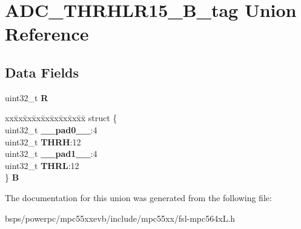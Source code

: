 \hypertarget{unionADC__THRHLR15__32B__tag}{}\section{A\+D\+C\+\_\+\+T\+H\+R\+H\+L\+R15\+\_\+B\+\_\+tag Union Reference}
\label{unionADC__THRHLR15__32B__tag}
\subsection*{Data Fields}
\begin{DoxyCompactItemize}
\item 
\mbox{\label{unionADC__THRHLR15__32B__tag_a14c2fc144d70d4cf0f5cd15288349dbd}} 
uint32\+\_\+t {\bfseries R}
\item 
\mbox{\label{unionADC__THRHLR15__32B__tag_a8a667bffa52e28fecea479ea8b7c681c}} 
\begin{tabbing}
xx\=xx\=xx\=xx\=xx\=xx\=xx\=xx\=xx\=\kill
struct \{\\
\>uint32\_t {\bfseries \_\_pad0\_\_}:4\\
\>uint32\_t {\bfseries THRH}:12\\
\>uint32\_t {\bfseries \_\_pad1\_\_}:4\\
\>uint32\_t {\bfseries THRL}:12\\
\} {\bfseries B}\\

\end{tabbing}\end{DoxyCompactItemize}


The documentation for this union was generated from the following file\+:\begin{DoxyCompactItemize}
\item 
bsps/powerpc/mpc55xxevb/include/mpc55xx/fsl-\/mpc564x\+L.\+h\end{DoxyCompactItemize}
